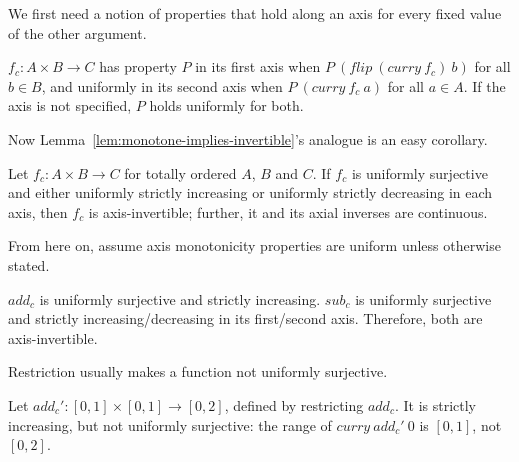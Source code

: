 We first need a notion of properties that hold along an axis for every fixed value of the other argument.

\begin{definition}
$f_c : A \times B \to C$ has property $P$  in its first axis when $P~(flip~(curry~f_c)~b)$ for all $b \in B$, and uniformly in its second axis when $P~(curry~f_c~a)$ for all $a \in A$.
If the axis is not specified, $P$ holds uniformly for both.
\end{definition}

Now Lemma~\ref{lem:monotone-implies-invertible}'s analogue is an easy corollary.

\begin{lemma}
\label{lem:uniformly-monotone-implies-invertible}
Let $f_c : A \times B \to C$ for totally ordered $A$, $B$ and $C$.
If $f_c$ is uniformly surjective and either uniformly strictly increasing or uniformly strictly decreasing in each axis, then $f_c$ is axis-invertible; further, it and its axial inverses are continuous.
\end{lemma}

From here on, assume axis monotonicity properties are uniform unless otherwise stated.

\begin{example}
$add_c$ is uniformly surjective and strictly increasing.
$sub_c$ is uniformly surjective and strictly increasing/decreasing in its first/second axis.
Therefore, both are axis-invertible.
\exampleqed
\end{example}

Restriction usually makes a function not uniformly surjective.

\begin{example}
Let $add_c' : [0,1] \times [0,1] \to [0,2]$, defined by restricting $add_c$.
It is strictly increasing, but not uniformly surjective: the range of $curry~add_c'~0$ is $[0,1]$, not $[0,2]$.
\exampleqed
\end{example}

